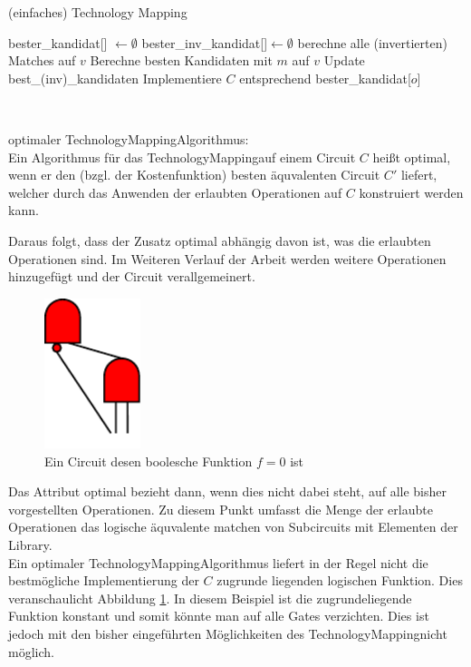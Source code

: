 \documentclass[11pt, a4paper, german]{article}
\newcommand{\TM}{TechnologyMapping}
\begin{document}
\begin{algorithm}[H]
 \LinesNumbered
 \DontPrintSemicolon
 \caption{(einfaches) Technology Mapping}

 bester\_kandidat[] $\gets \emptyset$\;
 bester\_inv\_kandidat[]$ \gets \emptyset$\;
 {
   berechne alle (invertierten) Matches auf $v$\;
   {
      Berechne besten Kandidaten mit $m$ auf $v$\;
      Update best\_(inv)\_kandidaten\;
   }
 }
 Implementiere $C$ entsprechend bester\_kandidat[$o$]\;
\end{algorithm}\ \\

\begin{definition}{optimaler \TM Algorithmus:}\\
	Ein Algorithmus für das \TM auf einem Circuit $C$ heißt optimal, wenn er den (bzgl. der Kostenfunktion) besten äquvalenten Circuit $C'$ liefert, welcher durch das Anwenden der erlaubten Operationen auf $C$ konstruiert werden kann. 
\end{definition}
Daraus folgt, dass der Zusatz optimal abhängig davon ist, was die erlaubten Operationen sind.
Im Weiteren Verlauf der Arbeit werden weitere Operationen hinzugefügt und der Circuit verallgemeinert. 
\begin{figure}
		\includegraphics[width = 2.8cm]{pictures/compiled/compl_redundant}
		\caption{Ein Circuit desen boolesche Funktion $f = 0 $ ist}
		\label{bild:compl_redundant}
\end{figure}
Das Attribut optimal bezieht dann, wenn dies nicht dabei steht,  auf alle bisher vorgestellten Operationen. Zu diesem Punkt umfasst die Menge der erlaubte Operationen das logische äquvalente matchen von Subcircuits mit Elementen der Library.\\

Ein optimaler \TM Algorithmus liefert in der Regel nicht die bestmögliche Implementierung der $C$ zugrunde liegenden logischen Funktion. Dies veranschaulicht Abbildung \ref{bild:compl_redundant}. In diesem Beispiel ist die zugrundeliegende Funktion konstant und somit könnte man auf alle Gates verzichten. Dies ist jedoch mit den bisher eingeführten Möglichkeiten des \TM nicht möglich. \\
\end{document}
